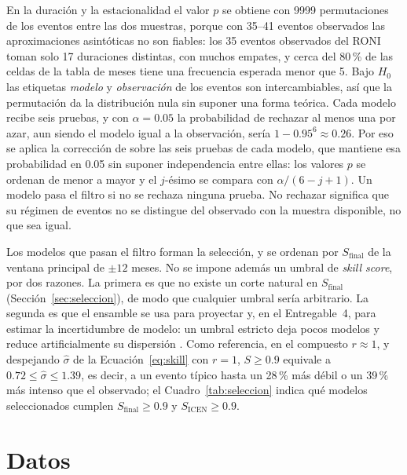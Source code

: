 \documentclass[11pt,a4paper]{article}
\begin{document}
\begin{itemize}[nosep]
\end{itemize}
En la duración y la estacionalidad el valor $p$ se obtiene con 9999 permutaciones de los eventos entre las dos muestras, porque con 35--41 eventos observados las aproximaciones asintóticas no son fiables: los 35 eventos observados del RONI toman solo 17 duraciones distintas, con muchos empates, y cerca del 80\,\% de las celdas de la tabla de meses tiene una frecuencia esperada menor que 5. Bajo $H_0$ las etiquetas \emph{modelo} y \emph{observación} de los eventos son intercambiables, así que la permutación da la distribución nula sin suponer una forma teórica. Cada modelo recibe seis pruebas, y con $\alpha = 0.05$ la probabilidad de rechazar al menos una por azar, aun siendo el modelo igual a la observación, sería $1-0.95^6 \approx 0.26$. Por eso se aplica la corrección de \citet{holm1979} sobre las seis pruebas de cada modelo, que mantiene esa probabilidad en 0.05 sin suponer independencia entre ellas: los valores $p$ se ordenan de menor a mayor y el $j$-ésimo se compara con $\alpha/(6-j+1)$. Un modelo pasa el filtro si no se rechaza ninguna prueba. No rechazar significa que su régimen de eventos no se distingue del observado con la muestra disponible, no que sea igual.

Los modelos que pasan el filtro forman la selección, y se ordenan por $S_{\mathrm{final}}$ de la ventana principal de $\pm12$ meses. No se impone además un umbral de \emph{skill score}, por dos razones. La primera es que no existe un corte natural en $S_{\mathrm{final}}$ (Sección~\ref{sec:seleccion}), de modo que cualquier umbral sería arbitrario. La segunda es que el ensamble se usa para proyectar y, en el Entregable~4, para estimar la incertidumbre de modelo: un umbral estricto deja pocos modelos y reduce artificialmente su dispersión \citep{zhong2023,gopika2024}. Como referencia, en el compuesto $r \approx 1$, y despejando $\hat\sigma$ de la Ecuación~\eqref{eq:skill} con $r = 1$, $S \geq 0.9$ equivale a $0.72 \leq \hat\sigma \leq 1.39$, es decir, a un evento típico hasta un 28\,\% más débil o un 39\,\% más intenso que el observado; el Cuadro~\ref{tab:seleccion} indica qué modelos seleccionados cumplen $S_{\mathrm{final}} \geq 0.9$ y $S_{\mathrm{ICEN}} \geq 0.9$.

\section{Datos}
\label{sec:datos}
\end{document}
